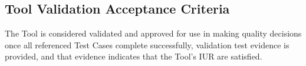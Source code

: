 \subsection{Tool Validation Acceptance Criteria}
The Tool is considered validated and approved for use in making quality decisions
once all referenced Test Cases complete successfully, validation test evidence
is provided, and that evidence indicates that the Tool's IUR are satisfied.
